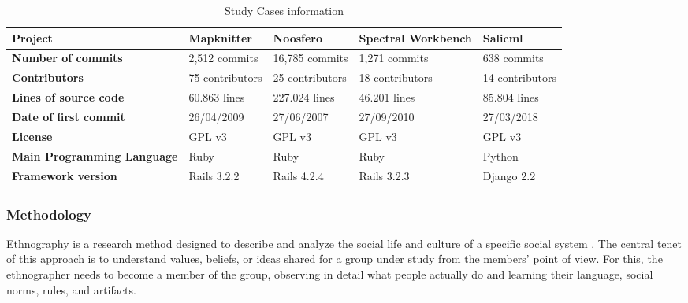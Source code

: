 \vspace{5mm}

\begin{table}[ht]
\begin{adjustbox}{width={460px},totalheight={180px}}
\begin{tabular}{|l|l|l|l|l|}
\hline
\textbf{Project}                   & \textbf{Mapknitter} & \textbf{Noosfero} &
Spectral Workbench & Salicml         \\ \hline
\textbf{Number of commits}         & 2,512 commits       & 16,785 commits    &
1,271 commits      & 638 commits     \\ \hline
\textbf{Contributors}              & 75 contributors     & 25 contributors   &
18 contributors    & 14 contributors \\ \hline
\textbf{Lines of source code}      & 60.863 lines        & 227.024 lines     &
46.201 lines       & 85.804 lines    \\ \hline
\textbf{Date of first commit}      & 26/04/2009          & 27/06/2007        &
27/09/2010         & 27/03/2018      \\ \hline
\textbf{License}                   & GPL v3              & GPL v3            &
GPL v3             & GPL v3          \\ \hline
\textbf{Main Programming Language} & Ruby                & Ruby              &
Ruby               & Python          \\ \hline
\textbf{Framework version}         & Rails 3.2.2         & Rails 4.2.4       &
Rails 3.2.3        & Django 2.2      \\ \hline
\end{tabular}
\end{adjustbox}
\caption{Study Cases information}
\label{table:studycases}
\end{table}

\subsubsection{Methodology}

Ethnography is a research method designed to describe and analyze the social
life and culture of a specific social system \cite{kennedy2013}. The central
tenet of this approach is to understand values, beliefs, or ideas shared for a
group under study from the members’ point of view. For this, the ethnographer
needs to become a member of the group, observing in detail what people actually
do and learning their language, social norms, rules, and artifacts.

